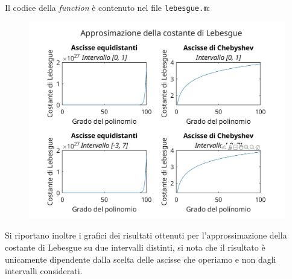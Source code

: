 \documentclass[10pt,a4paper]{article}
\begin{document}
\section{}
Il codice della \textit{function} è contenuto nel file \texttt{lebesgue.m}:\\

\begin{figure}[h]
  \centering
  \includegraphics[width=1.1\textwidth]{../figure/plot20}  
\end{figure}
Si riportano inoltre i grafici dei risultati ottenuti per l'approssimazione della costante di Lebesgue su due intervalli distinti, si nota che il risultato è unicamente dipendente dalla scelta delle ascisse che operiamo e non dagli intervalli considerati.
\clearpage

\section{}
\end{document}
